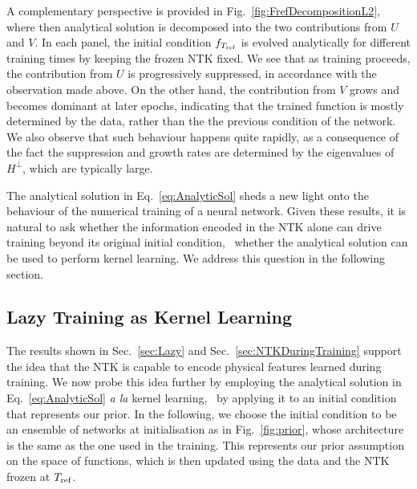 A complementary perspective is provided in Fig.~\ref{fig:FrefDecompositionL2},
where then analytical solution is decomposed into the two contributions from $U$
and $V$. In each panel, the initial condition $f_{T_{\rm ref}}$ is evolved
analytically for different training times by keeping the frozen NTK fixed. We
see that as training proceeds, the contribution from $U$ is progressively
suppressed, in accordance with the observation made above. On the other hand,
the contribution from $V$ grows and becomes dominant at later epochs, indicating
that the trained function is mostly determined by the data, rather than the the
previous condition of the network. We also observe that such behaviour happens
quite rapidly, as a consequence of the fact the suppression and growth rates are
determined by the eigenvalues of $H^\perp$, which are typically large.

The analytical solution in Eq.~\eqref{eq:AnalyticSol} sheds a new light onto the
behaviour of the numerical training of a neural network. Given these results, it
is natural to ask whether the information encoded in the NTK alone can drive
training beyond its original initial condition, \ie\ whether the analytical
solution can be used to perform kernel learning. We address this question in the
following section.

\subsection{Lazy Training as Kernel Learning}
\label{sec:NTKKernelLearning}

The results shown in Sec.~\ref{sec:Lazy} and Sec.~\ref{sec:NTKDuringTraining}
support the idea that the NTK is capable to encode physical features learned
during training. We now probe this idea further by employing the analytical
solution in Eq.~\eqref{eq:AnalyticSol} \textit{a la} kernel learning, \ie\ by
applying it to an initial condition that represents our prior. In the following,
we choose the initial condition to be an ensemble of networks at initialisation
as in Fig.~\ref{fig:prior}, whose architecture is the same as the one used in
the training. This represents our prior assumption on the space of functions,
which is then updated using the data and the NTK frozen at $T_{\rm ref}$.

